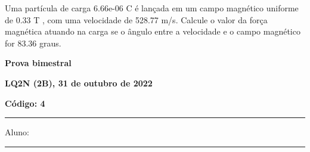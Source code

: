 \documentclass[12pt, addpoints]{exam}
\begin{document}
\begin{questions}
\begin{multicols*}{2}
\begin{oneparchoices}
\end{oneparchoices}
\question[20] Uma partícula de carga 6.66e-06 C é lançada em um campo magnético uniforme de    0.33 T , com uma velocidade de 528.77 m/s. Calcule o valor da força magnética atuando na carga se o ângulo entre a velocidade e o campo magnético for   83.36 graus.

\begin{oneparchoices}
\end{oneparchoices}
\end{multicols*}
\end{questions}
\newpage
        \begin{minipage}[b]{0.75\linewidth}
            \begin{flushleft}
                {\bf \large Prova bimestral}
            \end{flushleft}
            \begin{flushleft}
                {\bf \large LQ2N (2B), 31 de outubro de 2022}
            \end{flushleft}
        \end{minipage}
        \begin{minipage}[b]{0.20\linewidth}
            \begin{flushright}
                {\bf \large Código: 4}
            \end{flushright}
        \end{minipage}
        \vspace{0.5cm} \hrule \vspace{0.5cm}
        \begin{minipage}{0.75\linewidth}
            Aluno:
        \end{minipage}
        \vspace{0.5cm} \hrule \vspace{0.5cm}
\end{document}
